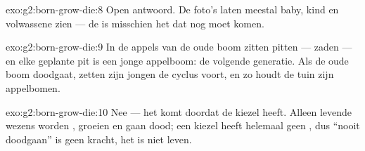 \begin{solution}{exo:g2:born-grow-die:8}
Open antwoord. De foto's laten meestal baby, kind en volwassene zien
--- de  is misschien het  dat nog moet komen.
\end{solution}

\begin{solution}{exo:g2:born-grow-die:9}
In de appels van de oude boom zitten pitten --- zaden --- en elke
geplante pit is een jonge appelboom: de volgende generatie. Als de oude
boom doodgaat, zetten zijn jongen de cyclus voort, en zo houdt de tuin
zijn appelbomen.
\end{solution}

\begin{solution}{exo:g2:born-grow-die:10}
Nee --- het komt doordat de kiezel  heeft. Alleen levende
wezens worden , groeien en gaan dood; een kiezel heeft helemaal
geen , dus ``nooit doodgaan'' is geen kracht, het is niet leven.
\end{solution}

